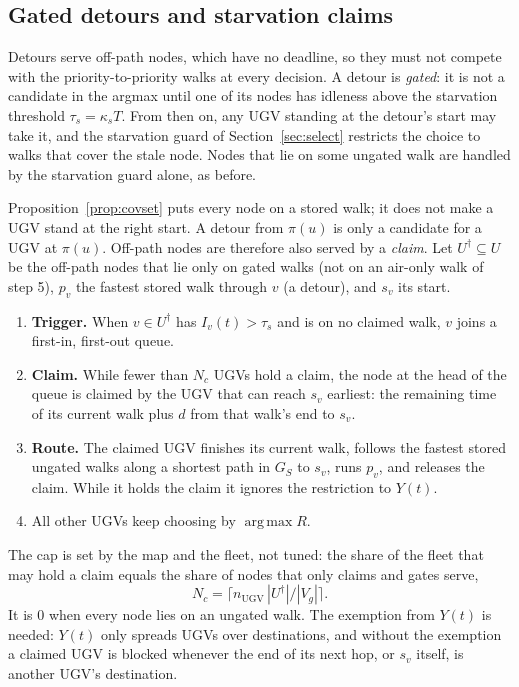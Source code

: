 \documentclass[11pt]{article}
\DeclareMathOperator*{\argmax}{arg\,max}
\theoremstyle{definition}
\theoremstyle{plain}
\begin{document}
\subsection{Gated detours and starvation claims}
\label{sec:claim}

Detours serve off-path nodes, which have no deadline, so they must not
compete with the priority-to-priority walks at every decision. A detour is
\emph{gated}: it is not a candidate in the argmax until one of its nodes has
idleness above the starvation threshold $\tau_s = \kappa_s T$. From then on,
any UGV standing at the detour's start may take it, and the starvation
guard of Section~\ref{sec:select} restricts the choice to walks that cover
the stale node. Nodes that lie on some ungated walk are handled by the
starvation guard alone, as before.

Proposition~\ref{prop:covset} puts every node on a stored walk; it does not
make a UGV stand at the right start. A detour from $\pi(u)$ is only a
candidate for a UGV at $\pi(u)$. Off-path nodes are therefore also served
by a \emph{claim}. Let $U^\dagger \subseteq U$ be the off-path nodes that lie
only on gated walks (not on an air-only walk of step 5), $p_v$ the fastest
stored walk through $v$ (a detour), and $s_v$ its start.
\begin{enumerate}
\item \textbf{Trigger.} When $v \in U^\dagger$ has $I_v(t) > \tau_s$ and is
on no claimed walk, $v$ joins a first-in, first-out queue.
\item \textbf{Claim.} While fewer than $N_c$ UGVs hold a claim, the node at
the head of the queue is claimed by the UGV that can reach $s_v$
earliest: the remaining time of its current walk plus $d$ from that walk's
end to $s_v$.
\item \textbf{Route.} The claimed UGV finishes its current walk, follows
the fastest stored ungated walks along a shortest path in $G_S$ to $s_v$,
runs $p_v$, and releases the claim. While it holds the claim it ignores
the restriction to $Y(t)$.
\item All other UGVs keep choosing by $\argmax R$.
\end{enumerate}
The cap is set by the map and the fleet, not tuned: the share of the fleet
that may hold a claim equals the share of nodes that only claims and gates
serve,
\begin{equation}
N_c = \Big\lceil n_{\mathrm{UGV}} \, |U^\dagger| / |V_g| \Big\rceil .
\end{equation}
It is 0 when every node lies on an ungated walk. The exemption from $Y(t)$
is needed: $Y(t)$ only spreads UGVs over destinations, and without the
exemption a claimed UGV is blocked whenever the end of its next hop, or
$s_v$ itself, is another UGV's destination.
\end{document}
